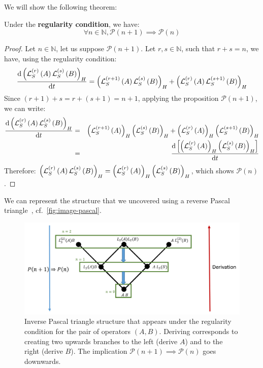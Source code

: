 We will show the following theorem:
\begin{theorem}
    Under the \textbf{regularity condition}, we have:
    \begin{equation}
        \forall n \in \mathbb{N}, \mathcal{P}(n+1) \implies \mathcal{P}(n)
    \end{equation}
\end{theorem}

\begin{proof}
    Let $n \in \mathbb{N}$, let us suppose $\mathcal{P}(n+1)$.
    Let $r, s \in \mathbb{N}$, such that $r+s=n$, we have, using the regularity condition:
    \begin{equation}
        \dv{\left(\mathcal{L}^{(r)}_S\left(A\right) \mathcal{L}^{(s)}_S\left(B\right)\right)_H}{t} = \left(\mathcal{L}^{(r+1)}_S\left(A\right) \mathcal{L}^{(s)}_S\left(B\right)\right)_H + \left(\mathcal{L}^{(r)}_S\left(A\right) \mathcal{L}^{(s+1)}_S\left(B\right)\right)_H
    \end{equation}
    Since $(r+1)+s = r+(s+1) = n+1$, applying the proposition $\mathcal{P}(n+1)$, we can write:
    \begin{eqnarray}
        \dv{\left(\mathcal{L}^{(r)}_S\left(A\right) \mathcal{L}^{(s)}_S\left(B\right)\right)_H}{t} &=& \left(\mathcal{L}^{(r+1)}_S\left(A\right)\right)_H \left(\mathcal{L}^{(s)}_S\left(B\right)\right)_H + \left(\mathcal{L}^{(r)}_S\left(A\right)\right)_H \left(\mathcal{L}^{(s+1)}_S\left(B\right)\right)_H\nonumber\\ 
        &=& \dv{\left[\left(\mathcal{L}^{(r)}_S\left(A\right)\right)_H \left(\mathcal{L}^{(s)}_S\left(B\right)\right)_H\right]}{t}
    \end{eqnarray}
    Therefore: $\left(\mathcal{L}^{(r)}_S\left(A\right) \mathcal{L}^{(s)}_S\left(B\right)\right)_H = \left(\mathcal{L}^{(r)}_S\left(A\right)\right)_H \left(\mathcal{L}^{(s)}_S\left(B\right)\right)_H$, which shows $\mathcal{P}(n)$.
\end{proof}

We can represent the structure that we uncovered using a reverse Pascal triangle~\cite{wiki-pascal-triangle}, cf.\@~\autoref{fig:image-pascal}.

\begin{center}
    \begin{figure}[h!]
      \centering
      \includegraphics[width=0.9\linewidth]{Pics/image-pascal.png}
      \caption{Inverse Pascal triangle structure that appears under the regularity condition for the pair of operators $(A, B)$. Deriving corresponds to creating two upwards branches to the left (derive $A$) and to the right (derive $B$). The implication $\mathcal{P}(n+1) \implies \mathcal{P}(n)$ goes downwards.}
      \label{fig:image-pascal}
    \end{figure}
\end{center}